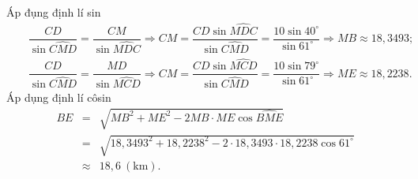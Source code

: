 \begin{bt}
{		Áp đụng định lí sin
		\begin{eqnarray*}
			&&\dfrac{CD}{\sin \widehat{CMD}} = \dfrac{CM}{\sin \widehat{MDC}} \Rightarrow CM = \dfrac{CD \sin \widehat{MDC}}{\sin \widehat{CMD}} = \dfrac{10\sin 40^{\circ}}{\sin 61^{\circ}} \Rightarrow MB \approx  18{,}3493; \\
			&&\dfrac{CD}{\sin \widehat{CMD}} = \dfrac{MD}{\sin \widehat{MCD}} \Rightarrow CM = \dfrac{CD \sin \widehat{MCD}}{\sin \widehat{CMD}} = \dfrac{10\sin 79^{\circ}}{\sin 61^{\circ}}  \Rightarrow ME\approx  18{,}2238.
		\end{eqnarray*}
		Áp dụng định lí côsin
		\begin{eqnarray*}
			BE &=&\sqrt{MB^2 + ME^2-2MB\cdot ME \cos \widehat{BME}} \\
			&=& \sqrt{18{,}3493^2+18{,}2238^2 - 2 \cdot 18{,}3493 \cdot 18{,}2238 \cos 61^\circ}  \\
			&\approx& 18{,}6 \mathrm{~(km)}.
		\end{eqnarray*}
	}
\end{bt}

